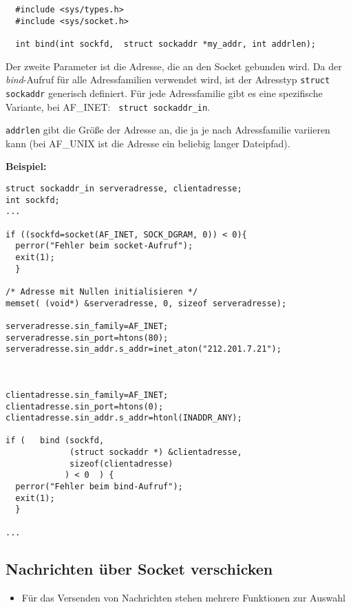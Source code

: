 \documentclass[12pt,utf8]{article}
\begin{document}
\begin{verbatim}
  #include <sys/types.h>
  #include <sys/socket.h>

  int bind(int sockfd,  struct sockaddr *my_addr, int addrlen);
\end{verbatim}

Der zweite Parameter ist die Adresse, die an den Socket gebunden wird.
Da der {\em bind\/}-Aufruf für alle Adressfamilien verwendet wird, ist
der Adresstyp {\tt struct sockaddr} generisch definiert. Für jede
Adressfamilie gibt es eine spezifische Variante, bei AF\_INET: {\tt
struct sockaddr\_in}.

{\tt addrlen} gibt die Größe der Adresse an, die ja je nach Adressfamilie
variieren kann (bei AF\_UNIX ist die Adresse ein beliebig langer Dateipfad).

{\bf Beispiel:}

\begin{verbatim}
struct sockaddr_in serveradresse, clientadresse;
int sockfd;
...

if ((sockfd=socket(AF_INET, SOCK_DGRAM, 0)) < 0){
  perror("Fehler beim socket-Aufruf");
  exit(1);
  }

/* Adresse mit Nullen initialisieren */
memset( (void*) &serveradresse, 0, sizeof serveradresse);

serveradresse.sin_family=AF_INET;
serveradresse.sin_port=htons(80);
serveradresse.sin_addr.s_addr=inet_aton("212.201.7.21");



clientadresse.sin_family=AF_INET;
clientadresse.sin_port=htons(0);
clientadresse.sin_addr.s_addr=htonl(INADDR_ANY);

if (   bind (sockfd,
             (struct sockaddr *) &clientadresse,
             sizeof(clientadresse)
            ) < 0  ) {
  perror("Fehler beim bind-Aufruf");
  exit(1);
  }

...

\end{verbatim}



\subsection*{Nachrichten über Socket verschicken}

\begin{itemize} 
\item Für das Versenden von Nachrichten stehen mehrere Funktionen zur
Auswahl
\end{itemize}
\end{document}
